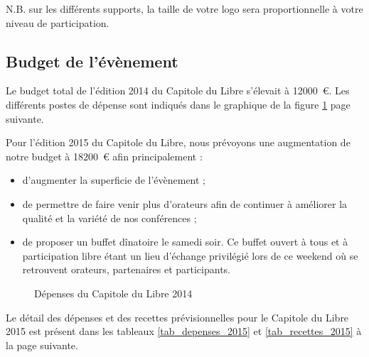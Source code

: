 N.B. sur les différents supports, la taille de votre logo sera proportionnelle à votre niveau de participation.

	\subsection{Budget de l’évènement}

Le budget total de l'édition 2014 du Capitole du Libre s'élevait à
 \SI{12000}{\euro}. Les différents postes de dépense sont indiqués dans
 le graphique de la figure \ref{fig_budget} page suivante.

Pour l'édition 2015 du Capitole du Libre, nous prévoyons une augmentation de notre budget à \SI{18200}{\euro} afin principalement :
\begin{itemize}[label=$\bullet$]
\item d'augmenter la superficie de l'évènement ;
\item de permettre de faire venir plus d'orateurs afin de continuer à améliorer la qualité et la variété de nos conférences ;
\item de proposer un buffet dînatoire le samedi soir. Ce buffet ouvert à tous et à participation libre étant un lieu d'échange privilégié lors de ce weekend où se retrouvent orateurs, partenaires et participants.
\end{itemize}

\begin{figure}
\begin{center}
\end{center}
\caption{Dépenses du Capitole du Libre 2014}\label{fig_budget}
\end{figure}

\Separateur

Le détail des dépenses et des recettes prévisionnelles pour le Capitole du Libre 2015 est présent dans les tableaux \ref{tab_depenses_2015} et \ref{tab_recettes_2015} à la page suivante.

